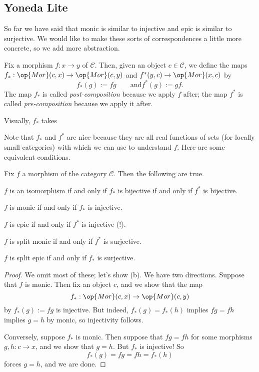 \subsection{Yoneda Lite}
So far we have said that monic is similar to injective and epic is similar to surjective. We would like to make these sorts of correspondences a little more concrete, so we add more abstraction.
\begin{definition}
	Fix a morphism $f:x\to y$ of $\mathcal C$. Then, given an object $c\in\mathcal C$, we define the maps $f_*:\op{Mor}(c,x)\to\op{Mor}(c,y)$ and $f^*(y,c)\to\op{Mor}(x,c)$ by
	\[f_*(g):=fg\qquad\text{and}f^*(g):=gf.\]
	The map $f_*$ is called \textit{post-composition} because we apply $f$ after; the map $f^*$ is called \textit{pre-composition} because we apply it after.
\end{definition}

Visually, $f_*$ takes

Note that $f_*$ and $f^*$ are nice because they are all real functions of sets (for locally small categories) with which we can use to understand $f$. Here are some equivalent conditions.
\begin{proposition}
	Fix $f$ a morphism of the category $\mathcal C$. Then the following are true.
	\begin{listalph}
		\item $f$ is an isomorphism if and only if $f_*$ is bijective if and only if $f^*$ is bijective.
		\item $f$ is monic if and only if $f_*$ is injective.
		\item $f$ is epic if and only if $f^*$ is injective (!).
		\item $f$ is split monic if and only if $f^*$ is surjective.
		\item $f$ is split epic if and only if $f_*$ is surjective.
	\end{listalph}
\end{proposition}
\begin{proof}
	We omit most of these; let's show (b). We have two directions. Suppose that $f$ is monic. Then fix an object $c$, and we show that the map
	\[f_*:\op{Mor}(c,x)\to\op{Mor}(c,y)\]
	by $f_*(g):=fg$ is injective. But indeed, $f_*(g)=f_*(h)$ implies $fg=fh$ implies $g=h$ by monic, so injectivity follows.

	Conversely, suppose $f_*$ is monic. Then suppose that $fg=fh$ for some morphisms $g,h:c\to x$, and we show that $g=h$. But $f_*$ is injective! So
	\[f_*(g)=fg=fh=f_*(h)\]
	forces $g=h$, and we are done.
\end{proof}